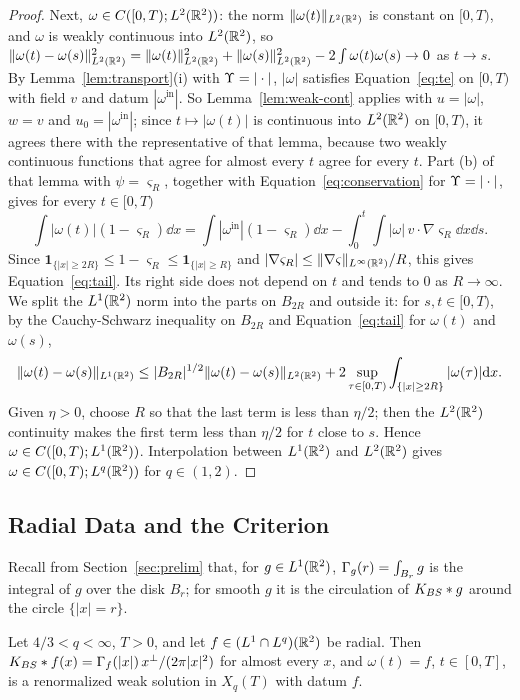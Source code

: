 \begin{proof}
Next, $\omega\in C([0,T);L^2(\mathbb{R}^2))$: the norm $\|\omega(t)\|_{L^2(\mathbb{R}^2)}$ is
constant on $[0,T)$, and $\omega$ is weakly continuous into $L^2(\mathbb{R}^2)$, so
$\|\omega(t)-\omega(s)\|_{L^2(\mathbb{R}^2)}^2=\|\omega(t)\|_{L^2(\mathbb{R}^2)}^2+\|\omega(s)\|_{L^2(\mathbb{R}^2)}^2-2\int\omega(t)\omega(s)\to0$
as $t\to s$. By Lemma~\ref{lem:transport}(i) with $\Upsilon=|\cdot|$, $|\omega|$
satisfies Equation~\eqref{eq:te} on $[0,T)$ with field $v$ and datum
$|\omega^{\mathrm{in}}|$. So Lemma~\ref{lem:weak-cont} applies with
$u=|\omega|$, $w=v$ and $u_0=|\omega^{\mathrm{in}}|$; since
$t\mapsto|\omega(t)|$ is continuous into $L^2(\mathbb{R}^2)$ on $[0,T)$, it agrees there with
the representative of that lemma, because two weakly continuous functions that
agree for almost every $t$ agree for every $t$. Part (b) of that lemma with
$\psi=\varsigma_R$, together with Equation~\eqref{eq:conservation} for
$\Upsilon=|\cdot|$, gives for every $t\in[0,T)$
\[
\int|\omega(t)|(1-\varsigma_R)\dd x
=\int|\omega^{\mathrm{in}}|(1-\varsigma_R)\dd x-\int_0^t\!\!\int|\omega|\,v\cdot\nabla\varsigma_R\dd x\dd s .
\]
Since $\mathbf 1_{\{|x|\ge2R\}}\le1-\varsigma_R\le\mathbf 1_{\{|x|\ge R\}}$ and
$|\nabla\varsigma_R|\le\|\nabla\varsigma\|_{L^\infty(\mathbb{R}^2)}/R$, this gives
Equation~\eqref{eq:tail}. Its right side does not depend on $t$ and tends to $0$
as $R\to\infty$. We split the $L^1(\mathbb{R}^2)$ norm into the parts on $B_{2R}$ and
outside it: for $s,t\in[0,T)$, by the Cauchy-Schwarz inequality on $B_{2R}$ and
Equation~\eqref{eq:tail} for $\omega(t)$ and $\omega(s)$,
\[
\|\omega(t)-\omega(s)\|_{L^1(\mathbb{R}^2)}
\le|B_{2R}|^{1/2}\|\omega(t)-\omega(s)\|_{L^2(\mathbb{R}^2)}
+2\sup_{\tau\in[0,T)}\int_{\{|x|\ge2R\}}|\omega(\tau)|\dd x .
\]
Given $\eta>0$, choose $R$ so that the last term is less than $\eta/2$; then the
$L^2(\mathbb{R}^2)$ continuity makes the first term less than $\eta/2$ for $t$ close to
$s$. Hence $\omega\in C([0,T);L^1(\mathbb{R}^2))$. Interpolation between $L^1(\mathbb{R}^2)$ and
$L^2(\mathbb{R}^2)$ gives $\omega\in C([0,T);L^q(\mathbb{R}^2))$ for $q\in(1,2)$.
\end{proof}

\subsection{Radial Data and the Criterion}

Recall from Section~\ref{sec:prelim} that, for $g\in L^1(\mathbb{R}^2)$,
$\Gamma_g(r)=\int_{B_r}g$ is the integral of $g$ over the disk $B_r$; for smooth
$g$ it is the circulation of $K_{BS}\ast g$ around the circle $\{|x|=r\}$.

\begin{lemma}
\label{lem:radial-stationary}
Let $4/3<q<\infty$, $T>0$, and let $f\in (L^1\cap L^q)(\mathbb{R}^2)$ be radial. Then
$K_{BS}\ast f(x)=\Gamma_f(|x|)\,x^\perp/(2\pi|x|^2)$ for almost every $x$, and
$\omega(t)=f$, $t\in[0,T]$, is a renormalized weak solution in $X_q(T)$ with
datum $f$.
\end{lemma}

